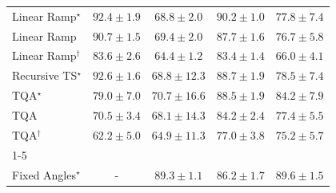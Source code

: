 \begin{tabular}{l|cccc|}
Linear Ramp$^\star$ & {\cellcolor[HTML]{702806}} \color[HTML]{F1F1F1} $92.4\pm 1.9$ & {\cellcolor[HTML]{FEB541}} \color[HTML]{000000} $68.8\pm 2.0$ & {\cellcolor[HTML]{842E05}} \color[HTML]{F1F1F1} $90.2\pm 1.0$ & {\cellcolor[HTML]{EA6E13}} \color[HTML]{F1F1F1} $77.8\pm 7.4$ \\
Linear Ramp & {\cellcolor[HTML]{802D05}} \color[HTML]{F1F1F1} $90.7\pm 1.5$ & {\cellcolor[HTML]{FEAF3D}} \color[HTML]{000000} $69.4\pm 2.0$ & {\cellcolor[HTML]{9C3604}} \color[HTML]{F1F1F1} $87.7\pm 1.6$ & {\cellcolor[HTML]{EE7617}} \color[HTML]{F1F1F1} $76.7\pm 5.8$ \\
Linear Ramp$^\dagger$ & {\cellcolor[HTML]{C44802}} \color[HTML]{F1F1F1} $83.6\pm 2.6$ & {\cellcolor[HTML]{FED36F}} \color[HTML]{000000} $64.4\pm 1.2$ & {\cellcolor[HTML]{C64902}} \color[HTML]{F1F1F1} $83.4\pm 1.4$ & {\cellcolor[HTML]{FEC95B}} \color[HTML]{000000} $66.0\pm 4.1$ \\
Recursive TS$^\star$ & {\cellcolor[HTML]{6C2706}} \color[HTML]{F1F1F1} $92.6\pm 1.6$ & {\cellcolor[HTML]{FEB541}} \color[HTML]{000000} $68.8\pm 12.3$ & {\cellcolor[HTML]{933204}} \color[HTML]{F1F1F1} $88.7\pm 1.9$ & {\cellcolor[HTML]{E56910}} \color[HTML]{F1F1F1} $78.5\pm 7.4$ \\
TQA$^\star$ & {\cellcolor[HTML]{E2650F}} \color[HTML]{F1F1F1} $79.0\pm 7.0$ & {\cellcolor[HTML]{FEA634}} \color[HTML]{000000} $70.7\pm 16.6$ & {\cellcolor[HTML]{943304}} \color[HTML]{F1F1F1} $88.5\pm 1.9$ & {\cellcolor[HTML]{BE4503}} \color[HTML]{F1F1F1} $84.2\pm 7.9$ \\
TQA & {\cellcolor[HTML]{FEA736}} \color[HTML]{000000} $70.5\pm 3.4$ & {\cellcolor[HTML]{FEBA46}} \color[HTML]{000000} $68.1\pm 14.3$ & {\cellcolor[HTML]{BE4503}} \color[HTML]{F1F1F1} $84.2\pm 2.4$ & {\cellcolor[HTML]{EC7014}} \color[HTML]{F1F1F1} $77.4\pm 5.5$ \\
TQA$^\dagger$ & {\cellcolor[HTML]{FEE08A}} \color[HTML]{000000} $62.2\pm 5.0$ & {\cellcolor[HTML]{FED069}} \color[HTML]{000000} $64.9\pm 11.3$ & {\cellcolor[HTML]{EE7416}} \color[HTML]{F1F1F1} $77.0\pm 3.8$ & {\cellcolor[HTML]{F4811D}} \color[HTML]{F1F1F1} $75.2\pm 5.7$ \\
\cline{1-5}
\multicolumn{5}{c}{\rule{0pt}{8pt}PP} \\
\midrule
Fixed Angles$^\star$ & {\cellcolor[HTML]{000000}} \color[HTML]{F1F1F1} {\cellcolor{white}} \color{black} - & {\cellcolor[HTML]{005F34}} \color[HTML]{F1F1F1} $89.3\pm 1.1$ & {\cellcolor[HTML]{0C723B}} \color[HTML]{F1F1F1} $86.2\pm 1.7$ & {\cellcolor[HTML]{005D33}} \color[HTML]{F1F1F1} $89.6\pm 1.5$ \\

\end{tabular}

